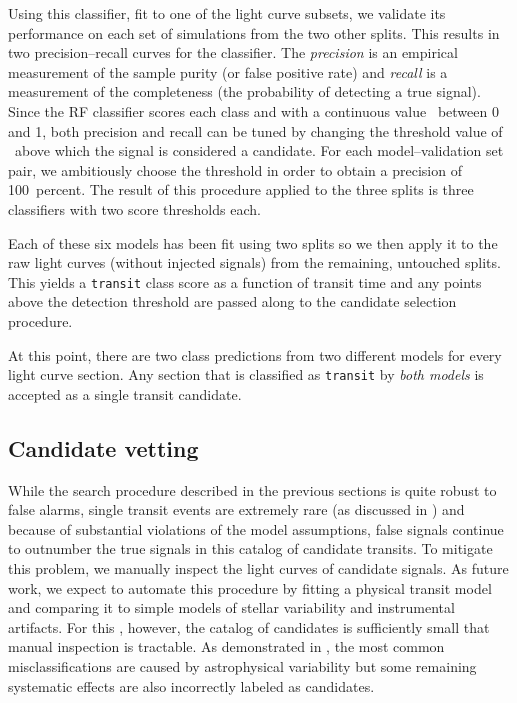 Using this classifier, fit to one of the light curve subsets, we validate its
performance on each set of simulations from the two other splits.
This results in two precision--recall curves for the classifier.
The \emph{precision} is an empirical measurement of the sample purity (or
false positive rate) and \emph{recall} is a measurement of the completeness
(the probability of detecting a true signal).
Since the RF classifier scores each class and with a continuous value \score\
between 0 and 1, both precision and recall can be tuned by changing the
threshold value of \score\ above which the signal is considered a candidate.
For each model--validation set pair, we ambitiously choose the threshold in
order to obtain a precision of 100~percent.
The result of this procedure applied to the three splits is three classifiers
with two score thresholds each.

Each of these six models has been fit using two splits so we then apply it to
the raw light curves (without injected signals) from the remaining, untouched
splits.
This yields a \texttt{transit} class score as a function of transit time and
any points above the detection threshold are passed along to the candidate
selection procedure.

At this point, there are two class predictions from two different models for
every light curve section.
Any section that is classified as \texttt{transit} by \emph{both models} is
accepted as a single transit candidate.



\subsection{Candidate vetting}

While the search procedure described in the previous sections is quite robust
to false alarms, single transit events are extremely rare (as discussed in
\sect{est}) and because of substantial violations of the model assumptions,
false signals continue to outnumber the true signals in this catalog of
candidate transits.
To mitigate this problem, we manually inspect the light curves of candidate
signals.
As future work, we expect to automate this procedure by fitting a physical
transit model and comparing it to simple models of stellar variability and
instrumental artifacts.
For this \paper, however, the catalog of candidates is sufficiently small that
manual inspection is tractable.
As demonstrated in , the most common misclassifications are caused
by astrophysical variability but some remaining systematic effects are also
incorrectly labeled as candidates.


